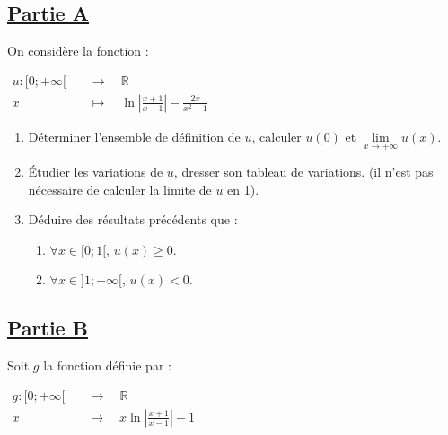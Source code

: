 \documentclass[12pt,a4paper]{article}
\begin{document}
\subsection*{\underline{\textbf{Partie A}}}

On considère la fonction :

\(
\begin{aligned}
    u : [0; +\infty[ \quad & \longrightarrow \quad \mathbb{R}                                          \\
    x \quad                & \longmapsto \quad \ln \left| \frac{x+1}{x-1} \right| - \frac{2x}{x^2 - 1}
\end{aligned}
\)

\begin{enumerate}
    \item Déterminer l’ensemble de définition de \( u \), calculer \( u(0) \) et \( \lim\limits_{x \to +\infty} u(x) \).
    \item Étudier les variations de \( u \), dresser son tableau de variations. (il n’est pas nécessaire de calculer la limite de \( u \) en 1).
    \item Déduire des résultats précédents que :
          \begin{enumerate}
              \item \( \forall x \in [0;1[ \), \( u(x) \geq 0 \).
              \item \( \forall x \in ]1; +\infty[ \), \( u(x) < 0 \).
          \end{enumerate}
\end{enumerate}

\subsection*{\underline{\textbf{Partie B}}}

Soit \( g \) la fonction définie par :

\(
\begin{aligned}
    g : [0; +\infty[ \quad & \longrightarrow \quad \mathbb{R}                           \\
    x \quad                & \longmapsto \quad x \ln \left| \frac{x+1}{x-1} \right| - 1
\end{aligned}
\)
\end{document}
